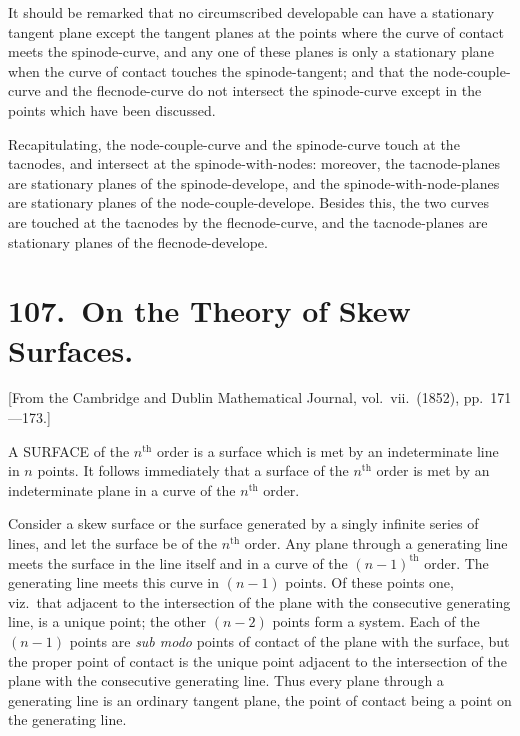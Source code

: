\documentclass[11pt,a4paper]{article}
\theoremstyle{plain}
\begin{document}
It should be remarked that no circumscribed developable can have a stationary tangent plane except the tangent planes at the points where the curve of contact meets the spinode-curve, and any one of these planes is only a stationary plane when the curve of contact touches the spinode-tangent; and that the node-couple-curve and the flecnode-curve do not intersect the spinode-curve except in the points which have been discussed.

Recapitulating, the node-couple-curve and the spinode-curve touch at the tacnodes, and intersect at the spinode-with-nodes: moreover, the tacnode-planes are stationary planes of the spinode-develope, and the spinode-with-node-planes are stationary planes of the node-couple-develope. Besides this, the two curves are touched at the tacnodes by the flecnode-curve, and the tacnode-planes are stationary planes of the flecnode-develope.
\clearpage


\section*{107.\ On the Theory of Skew Surfaces.}

[From the Cambridge and Dublin Mathematical Journal, vol.\ vii.\ (1852), pp.\ 171---173.]

\bigskip

A SURFACE of the $n^{\text{th}}$ order is a surface which is met by an indeterminate line in $n$ points. It follows immediately that a surface of the $n^{\text{th}}$ order is met by an indeterminate plane in a curve of the $n^{\text{th}}$ order.

Consider a skew surface or the surface generated by a singly infinite series of lines, and let the surface be of the $n^{\text{th}}$ order. Any plane through a generating line meets the surface in the line itself and in a curve of the $(n-1)^{\text{th}}$ order. The generating line meets this curve in $(n-1)$ points. Of these points one, viz.\ that adjacent to the intersection of the plane with the consecutive generating line, is a unique point; the other $(n-2)$ points form a system. Each of the $(n-1)$ points are \emph{sub modo} points of contact of the plane with the surface, but the proper point of contact is the unique point adjacent to the intersection of the plane with the consecutive generating line. Thus every plane through a generating line is an ordinary tangent plane, the point of contact being a point on the generating line.
\end{document}
